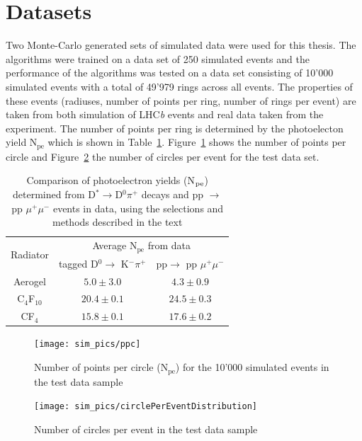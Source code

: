 \documentclass[11pt]{scrreprt}
\begin{document}
\section{Datasets} %
\label{sec:dataset}
Two Monte-Carlo generated sets of simulated data were used for this thesis. The algorithms were trained on a data set of 250 simulated events and the performance of the algorithms was tested on a data set consisting of 10'000 simulated events with a total of 49'979 rings across all events. The properties of these events (radiuses, number of points per ring, number of rings per event) are taken from both simulation of LHC\textit{b} events and
real data taken from the experiment. The number of points per ring is determined by the photoelecton yield N$_\text{pe}$ which is shown in Table~\ref{tab:results}. Figure~\ref{fig:ppc1} shows the number of points per circle and Figure~\ref{fig:circlePerEventDist} the number of circles per event for the test data set.

\begin{table}[tb]
\centering
\begin{tabular}{c c c}
\toprule
\multirow{2}{*}{Radiator} & \multicolumn{2}{c}{Average N$_{\text{pe}}$ from data} \\
\cmidrule{2-3} &  tagged D$^0 \rightarrow$ K$^- \pi^+$ &pp$ \rightarrow$ pp $\mu^+ \mu^-$ \\
\midrule
Aerogel & $5.0 \pm 3.0$  & $4.3 \pm 0.9$\\
C$_4$F$_{10}$  & $20.4 \pm 0.1$ & $24.5 \pm 0.3$ \\
CF$_4$ & $ 15.8 \pm 0.1$  & $ 17.6 \pm 0.2$ \\ 
\bottomrule
\end{tabular}
\caption[Comparison of photoelectron yields (N$_{\rm pe}$)]{Comparison of photoelectron yields (N$_{\rm pe}$) determined from
D$^* \rightarrow$D$^0\pi^+$ decays and pp $\rightarrow$ pp $\mu^+ \mu^-$ events in data, using the selections and 
methods described in the text \cite{RICHPerf2012}}
\label{tab:results}
\end{table}

\begin{figure}[tb]
  \centering
  \texttt{[image: sim\_pics/ppc]}
  \caption{Number of points per circle (N$_\text{pe}$) for the 10'000 simulated events in the test data sample}
  \label{fig:ppc1}
\end{figure}

\begin{figure}[tb]
  \centering
  \texttt{[image: sim\_pics/circlePerEventDistribution]}
  \caption{Number of circles per event in the test data sample}
  \label{fig:circlePerEventDist}
\end{figure}
\end{document}
